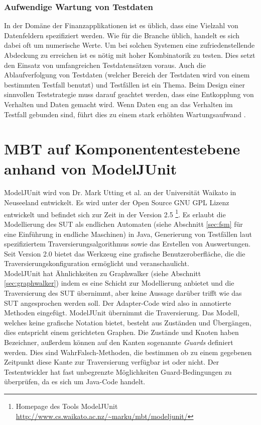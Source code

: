 \subsubsection{Aufwendige Wartung von Testdaten}
In der Domäne der Finanzapplikationen ist es üblich, dass eine Vielzahl von Datenfeldern spezifiziert werden. Wie für die Branche üblich, handelt es sich dabei oft um numerische Werte. Um bei solchen Systemen eine zufriedenstellende Abdeckung zu erreichen ist es nötig mit hoher Kombinatorik zu testen. Dies setzt den Einsatz von umfangreichen Testdatensätzen voraus. Auch die Ablaufverfolgung von Testdaten (welcher Bereich der Testdaten wird von einem bestimmten Testfall benutzt) und Testfällen ist ein Thema. Beim Design einer sinnvollen Teststrategie muss darauf geachtet werden, dass eine Entkopplung von Verhalten und Daten gemacht wird. Wenn Daten eng an das Verhalten im Testfall gebunden sind, führt dies zu einem stark erhöhten Wartungsaufwand \cite{baker_model-driven_2005}. 

\section{MBT auf Komponententestebene anhand von ModelJUnit}
\label{sec:modeljunit}
ModelJUnit wird von Dr. Mark Utting et al. an der Universität Waikato in Neuseeland entwickelt. Es wird unter der Open Source GNU GPL Lizenz entwickelt und befindet sich zur Zeit in der Version 2.5 \footnote{Homepage des Tools ModelJUnit \url{http://www.cs.waikato.ac.nz/~marku/mbt/modeljunit/}}. Es erlaubt die Modellierung des \Gls{SUT} als endlichen Automaten (siehe Abschnitt \ref{sec:fsm} für eine Einführung in endliche Maschinen) in Java, Generierung von Testfällen laut spezifiziertem Traversierungsalgorithmus sowie das Erstellen von Auswertungen. Seit Version 2.0 bietet das Werkzeug eine grafische Benutzeroberfläche, die die Traversierungskonfiguration ermöglicht und veranschaulicht.\\
ModelJUnit hat Ähnlichkeiten zu Graphwalker (siehe Abschnitt \ref{sec:graphwalker}) indem es eine Schicht zur Modellierung anbietet und die Traversierung des \gls{SUT} übernimmt, aber keine Aussage darüber trifft wie das \gls{SUT} angesprochen werden soll. Der Adapter-Code wird also in annotierte Methoden eingefügt. ModelJUnit übernimmt die Traversierung. Das Modell, welches keine grafische Notation bietet, besteht aus Zuständen und Übergängen, dies entspricht einem gerichteten Graphen. Die Zustände und Knoten haben Bezeichner, außerdem können auf den Kanten sogenannte \textit{Guards} definiert werden. Dies sind WahrFalsch-Methoden, die bestimmen ob zu einem gegebenen Zeitpunkt diese Kante zur Traversierung verfügbar ist oder nicht. Der Testentwickler hat fast unbegrenzte Möglichkeiten Guard-Bedingungen zu überprüfen, da es sich um Java-Code handelt.


